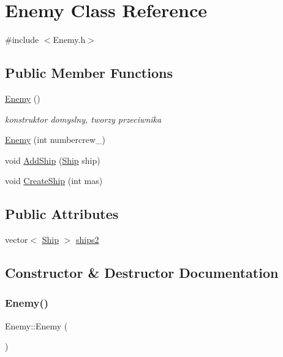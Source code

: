 \hypertarget{class_enemy}{}\section{Enemy Class Reference}
\label{class_enemy}


{\ttfamily \#include $<$Enemy.\+h$>$}

\subsection*{Public Member Functions}
\begin{DoxyCompactItemize}
\item 
\hyperlink{class_enemy_a94f30d348b6d2840fd71675472ba38dd}{Enemy} ()
\begin{DoxyCompactList}\small\item\em konstruktor domyslny, tworzy przeciwnika \end{DoxyCompactList}\item 
\hyperlink{class_enemy_abaf7fffe0200056c76228d6e27904e40}{Enemy} (int numbercrew\+\_\+)
\item 
void \hyperlink{class_enemy_ad876e376e71d068698bcc7656b68f753}{Add\+Ship} (\hyperlink{class_ship}{Ship} ship)
\item 
void \hyperlink{class_enemy_aaadffa4aee876d722b821fe2588ed0ae}{Create\+Ship} (int mas)
\end{DoxyCompactItemize}
\subsection*{Public Attributes}
\begin{DoxyCompactItemize}
\item 
vector$<$ \hyperlink{class_ship}{Ship} $>$ \hyperlink{class_enemy_a8d89e5413c698cba1b9164eddf1bdb87}{ships2}
\end{DoxyCompactItemize}


\subsection{Constructor \& Destructor Documentation}
\mbox{\label{class_enemy_a94f30d348b6d2840fd71675472ba38dd}} 
\subsubsection{\texorpdfstring{Enemy()}{Enemy()}\hspace{0.1cm}{\footnotesize\ttfamily [1/2]}}
{\footnotesize\ttfamily Enemy\+::\+Enemy (\begin{DoxyParamCaption}{ }\end{DoxyParamCaption})\hspace{0.3cm}{\ttfamily [inline]}}



